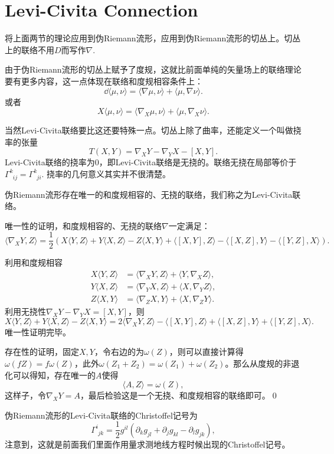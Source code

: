 \section{Levi-Civita Connection}
将上面两节的理论应用到伪Riemann流形，应用到伪Riemann流形的切丛上。切丛上的联络不用$D$而写作$\nabla$.

由于伪Riemann流形的切丛上赋予了度规，这就比前面单纯的矢量场上的联络理论要有更多内容，这一点体现在联络和度规相容条件上：
\[
	\dd \langle \mu,\nu\rangle=\langle \nabla\mu,\nu\rangle+\langle\mu,\nabla\nu\rangle.
\]
或者
\[
	X \langle \mu,\nu\rangle=\langle \nabla_X\mu,\nu\rangle+\langle\mu,\nabla_X\nu\rangle.
\]

当然Levi-Civita联络要比这还要特殊一点。切丛上除了曲率，还能定义一个叫做挠率的张量
\[
	T(X,Y)=\nabla_X Y-\nabla_Y X-[X,Y].
\]
Levi-Civita联络的挠率为0，即Levi-Civita联络是无挠的。联络无挠在局部等价于$\Gamma^{k}_{\phantom{k}ij}=\Gamma^{k}_{\phantom{k}ji}$. 挠率的几何意义其实并不很清楚。

\theo 伪Riemann流形存在唯一的和度规相容的、无挠的联络，我们称之为Levi-Civita联络。

\proof 唯一性的证明，和度规相容的、无挠的联络$\nabla$一定满足：
\[
	\langle \nabla_XY,Z\rangle=\frac{1}{2}\left(X\langle Y,Z\rangle+Y\langle X,Z\rangle-Z\langle X,Y\rangle+\langle[X,Y],Z\rangle-\langle[X,Z],Y\rangle-\langle[Y,Z],X\rangle\right).
\]

利用和度规相容
\begin{align*}
	X\langle Y,Z\rangle&=\langle \nabla_XY,Z\rangle+\langle Y,\nabla_XZ\rangle,\\
	Y\langle X,Z\rangle&=\langle \nabla_YX,Z\rangle+\langle X,\nabla_YZ\rangle,\\
	Z\langle X,Y\rangle&=\langle \nabla_ZX,Y\rangle+\langle X,\nabla_ZY\rangle.
\end{align*}
利用无挠性$\nabla_X Y-\nabla_Y X=[X,Y]$，则
\[
	X\langle Y,Z\rangle+Y\langle X,Z\rangle-Z\langle X,Y\rangle=2\langle \nabla_XY,Z\rangle-\langle[X,Y],Z\rangle+\langle[X,Z],Y\rangle+\langle[Y,Z],X\rangle.
\]
唯一性证明完毕。

存在性的证明，固定$X,Y$，令右边的为$\omega(Z)$，则可以直接计算得$\omega(fZ)=f\omega(Z)$，此外$\omega(Z_1+Z_2)=\omega(Z_1)+\omega(Z_2)$。那么从度规的非退化可以得知，存在唯一的$A$使得
\[
	\langle A,Z\rangle=\omega(Z),
\]
这样子，令$\nabla_XY=A$，最后检验这是一个无挠、和度规相容的联络即可。\qed

伪Riemann流形的Levi-Civita联络的Christoffel记号为
\[
	\Gamma^i_{\phantom{i}jk}=\frac{1}{2}g^{il}(\partial_k g_{jl}+\partial_j g_{kl}-\partial_l g_{jk}),
\]
注意到，这就是前面我们里面作用量求测地线方程时候出现的Christoffel记号。


